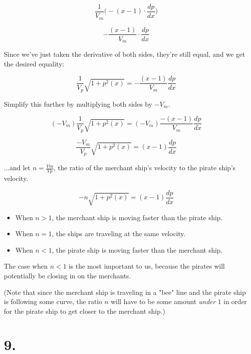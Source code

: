 \documentclass[11pt]{report}
\begin{document}
$$
\frac{1}{V_m}
\Big(
	-
	(x-1) \cdot \frac{dp}{dx}
\Big)
$$

$$
-\frac{(x-1)}{V_m}
\cdot \frac{dp}{dx}
$$

Since we've just taken the derivative of both sides, they're still equal, and
we get the desired equality:

$$
\frac{1}{V_p} \sqrt{1 + p^2(x)}
=
-\frac{(x-1)}{V_m} \frac{dp}{dx}
$$

Simplify this further by multiplying both sides by $-V_m$.

$$
(-V_m)
\frac{1}{V_p} \sqrt{1 + p^2(x)}
=
(-V_m)
\frac{-(x-1)}{V_m} \frac{dp}{dx}
$$

$$
\frac{-V_m}{V_p} \sqrt{1 + p^2(x)}
=
(x-1) \frac{dp}{dx}
$$

...and let $n = \frac{Vm}{Vp}$, the ratio of the
merchant ship's velocity to the pirate ship's velocity.

$$
-n \sqrt{1 + p^2(x)}
=
(x-1) \frac{dp}{dx}
$$

\begin{itemize}
	\item When $n > 1$, the merchant ship is moving faster than the pirate ship.
	\item When $n = 1$, the ships are traveling at the same velocity.
	\item When $n < 1$, the pirate ship is moving faster than the
merchant ship.
\end{itemize}

The case when $n < 1$ is the most important to us, because the pirates will potentially be closing in on the merchants.

(Note that since the merchant ship is traveling in a "bee" line and the pirate ship is 
following some curve, the ratio $n$ will have to be some amount \emph{under} $1$ in order
for the pirate ship to get closer to the merchant ship.)

\section*{9.}
\end{document}
